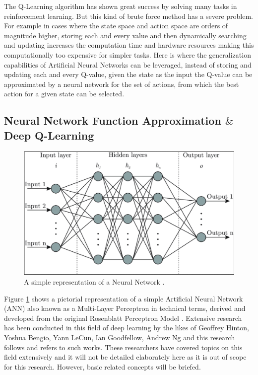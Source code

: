 The Q-Learning algorithm has shown great success by solving many tasks in reinforcement learning. But this kind of brute force method has a severe problem. For example in cases where the state space and action space are orders of magnitude higher, storing each and every value and then dynamically searching and updating increases the computation time and hardware resources making this computationally too expensive for simpler tasks. Here is where the generalization capabilities of Artificial Neural Networks \cite{mcculloch1943logical} can be leveraged, instead of storing and updating each and every Q-value, given the state as the input the Q-value can be approximated by a neural network for the set of actions, from which the best action for a given state can be selected. \\

\subsection{Neural Network Function Approximation $\&$ Deep Q-Learning}

\begin{figure}[h!]
    \centering
    \includegraphics[width=\textwidth]{images/ANN.png}
    \caption{A simple representation of a Neural Network \cite{ANNPic}.}
    \label{fig:ANN}
\end{figure}

Figure \ref{fig:ANN} shows a pictorial representation of a simple Artificial Neural Network (ANN) also known as a Multi-Layer Perceptron in technical terms, derived and developed from the original Rosenblatt Perceptron Model \cite{rosenblatt1958perceptron}. Extensive research has been conducted in this field of deep learning by the likes of Geoffrey Hinton, Yoshua Bengio, Yann LeCun, Ian Goodfellow, Andrew Ng and this research follows and refers to such works. These researchers have covered topics on this field extensively and it will not be detailed elaborately here as it is out of scope for this research. However, basic related concepts will be briefed. \\

